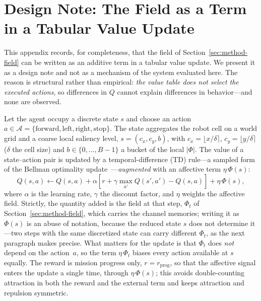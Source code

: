 \section{Design Note: The Field as a Term in a Tabular Value Update}
\label{app:update}
This appendix records, for completeness, that the field of
Section~\ref{sec:method-field} can be written as an additive term in a tabular
value update. We present it as a design note and not as a mechanism of the system
evaluated here. The reason is structural rather than empirical: \emph{the value
table does not select the executed actions}, so differences in $Q$ cannot explain
differences in behavior---and none are observed.

Let the agent occupy a discrete state $s$ and choose an action
$a \in \mathcal{A} = \{\text{forward}, \text{left}, \text{right},
\text{stop}\}$. The state aggregates the robot cell on a world grid and a
coarse local saliency level, $s = (c_x, c_y, b)$, with
$c_x=\lfloor x/\delta \rceil$, $c_y=\lfloor y/\delta \rceil$ ($\delta$ the cell
size) and $b\in\{0,\dots,B{-}1\}$ a bucket of the local $|\Phi|$. The value of a
state--action pair is updated by a temporal-difference (TD) rule---a sampled
form of the Bellman optimality update~\cite{bellman1957}---\emph{augmented}
with an affective term $\eta\,\Phi(s)$:
\begin{equation}
\label{eq:bellman}
Q(s,a) \leftarrow Q(s,a) + \alpha\!\left[r + \gamma \max_{a'} Q(s',a') - Q(s,a)\right]
+ \eta\,\Phi(s),
\end{equation}
where $\alpha$ is the learning rate, $\gamma$ the discount factor, and $\eta$
weights the affective field. Strictly, the quantity added is the field at that
step, $\Phi_t$ of Section~\ref{sec:method-field}, which carries the channel
memories; writing it as $\Phi(s)$ is an abuse of notation, because the reduced
state $s$ does not determine it---two steps with the same discretized state can
carry different $\Phi_t$, as the next paragraph makes precise. What matters for
the update is that $\Phi_t$ does \emph{not} depend on the action~$a$, so the term
$\eta\,\Phi_t$ biases every action available at $s$ equally. The reward is mission progress only, $r = r_{\text{prog}}$, so that the
affective signal enters the update a single time, through $\eta\,\Phi(s)$; this
avoids double-counting attraction in both the reward and the external term and
keeps attraction and repulsion symmetric.

